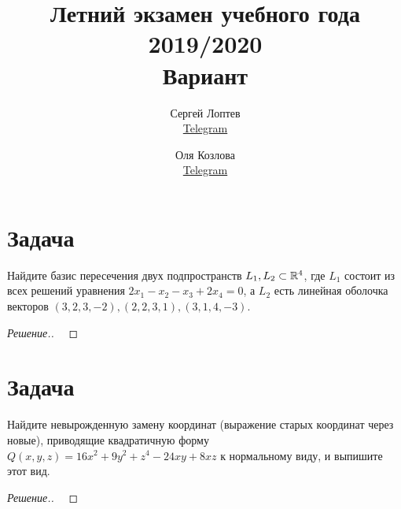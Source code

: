 \documentclass[a4paper]{article}
\title{Летний экзамен учебного года 2019/2020\\Вариант \textnumero 1}
\author{	
	Сергей Лоптев        \\ \href{https://t.me/beast_sl}{Telegram} \and
	Оля Козлова        \\ \href{https://t.me/grenlayk}{Telegram}
}
\date{}
\theoremstyle{remark}
\begin{document}
	\maketitle
    \section*{Задача }
        Найдите базис пересечения двух подпространств $L_1, L_2 \subset \mathbb{R}^4$,
        где $L_1$ состоит из всех решений уравнения $2x_1 - x_2 - x_3 + 2x_4 = 0$, 
        а $L_2$ есть линейная оболочка векторов $(3, 2, 3, -2), (2, 2, 3, 1), 
        (3, 1, 4, -3)$.
        \begin{proof}[Решение.] \ 
            

        \end{proof}
    \section*{Задача }
        Найдите невырожденную замену координат (выражение старых координат через 
        новые), приводящие квадратичную форму $Q(x, y, z) = 16x^2 + 9y^2 + z^4 - 24xy + 8xz$
        к нормальному виду, и выпишите этот вид.
        \begin{proof}[Решение.] \ 
            

        \end{proof}

\end{document}
